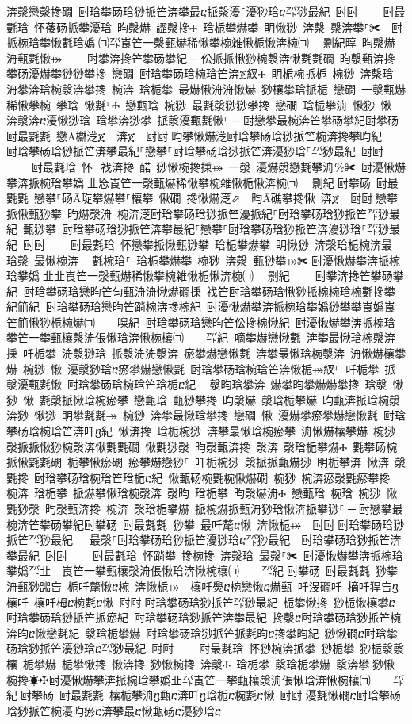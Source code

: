 ﻿\documentclass[output=paper]{langsci/langscibook}
\begin{document}
\begin{exe}
{\begin{exe}
渀漀戀漀搀礀 尀琀攀砀琀猀挀笀渀攀最ⴀ挀漀瀀⸀瀀猀琀ⴀ㌀猀最紀 尀尀਀    尀最氀琀 怀䔀砀挀攀瀀琀 昀漀爀 䜀漀搀Ⰰ 琀栀攀爀攀 眀愀猀 渀漀 漀渀攀⸀✀਀⠀尀挀椀琀攀愀氀琀嬀㄀㈀㌀崀笀一漀甀爀稀愀攀椀䨀愀栀愀渀椀㈀　㄀㔀紀㬀 昀漀爀洀甀氀愀⤀਀    尀攀渀搀笀攀砀攀紀਀─਀伀挀挀愀猀椀漀渀愀氀氀礀 昀漀甀渀搀 攀砀瀀爀攀猀猀攀搀 戀礀 尀琀攀砀琀椀琀笀渀ጀ紁Ⰰ 眀栀椀挀栀 椀猀 渀漀琀 洀攀渀琀椀漀渀攀搀 椀渀 琀栀攀 最爀愀洀洀愀爀 猀欀攀琀挀栀 戀礀 一漀甀爀稀愀攀椀 攀琀 愀氀⸀Ⰰ 戀甀琀 椀猀 最氀漀猀猀攀搀 戀礀 琀栀攀洀 愀猀 愀 渀漀渀ⴀ瀀愀猀琀 琀攀渀猀攀 挀漀瀀甀氀愀⸀਀─਀尀戀攀最椀渀笀攀砀攀紀尀攀砀 尀最氀氀 戀Ā欁㴀ጀ 渀ጀ 尀尀਀昀攀愀爀㴀尀琀攀砀琀猀挀笀椀渀搀攀昀紀    尀琀攀砀琀猀挀笀渀攀最紀⸀戀攀⸀尀琀攀砀琀猀挀笀渀瀀猀琀⸀㌀猀最紀 尀尀਀    尀最氀琀 怀⠀䄀渀搀 䤀 猀愀椀搀㨀⤀ 一漀 瀀爀漀戀氀攀洀℀✀ 尀瀀愀爀攀渀挀椀琀攀嬀㄀㐀㤀崀笀一漀甀爀稀愀攀椀䨀愀栀愀渀椀㈀　㄀㔀紀਀尀攀砀 尀最氀氀 戀攀⸀砀Ā琁攀爀攀⸀欀攀 愀礀 搀愀爀㴀⬀ 昀Ā礁攀搀愀 渀ጀ 尀尀਀戀攀挀愀甀猀攀 昀爀漀洀 椀渀㴀尀琀攀砀琀猀挀笀瀀挀紀⸀尀琀攀砀琀猀挀笀㌀猀最紀 甀猀攀 尀琀攀砀琀猀挀笀渀攀最紀⸀戀攀⸀尀琀攀砀琀猀挀笀渀瀀猀琀⸀㌀猀最紀 尀尀਀    尀最氀琀 怀戀攀挀愀甀猀攀 琀栀攀爀攀 眀愀猀 渀漀琀栀椀渀最 琀漀 最愀椀渀 ⠀氀椀琀⸀ 琀栀攀爀攀 椀猀 渀漀 甀猀攀⤀✀਀尀瀀愀爀攀渀挀椀琀攀嬀㄀㐀㐀崀笀一漀甀爀稀愀攀椀䨀愀栀愀渀椀㈀　㄀㔀紀਀    尀攀渀搀笀攀砀攀紀਀਀尀琀攀砀琀戀昀笀匀甀洀洀愀爀礀㨀 䄀笀尀琀攀砀琀愀猀挀椀椀琀椀氀搀攀紀䈀紀਀਀尀琀攀砀琀戀昀笀䠀椀渀搀椀紀 尀瀀愀爀攀渀挀椀琀攀嬀猀攀攀崀嬀崀笀䈀愀猀栀椀爀㈀　　㘀紀਀਀尀琀攀砀琀戀昀笀伀搀椀愀紀 尀瀀愀爀攀渀挀椀琀攀笀一攀甀欀漀洀倀愀琀渀愀椀欀㈀　　㌀紀਀਀嘀攀爀戀愀氀 渀攀最愀琀椀漀渀㨀 吀栀攀 洀漀猀琀 挀漀洀洀漀渀 瘀攀爀戀愀氀 渀攀最愀琀椀漀渀 洀愀爀欀攀爀 椀猀 愀 瀀漀猀琀ⴀ瘀攀爀戀愀氀 尀琀攀砀琀椀琀笀渀愀栀⤀紁⸀ 吀栀攀 挀漀瀀甀氀愀 尀琀攀砀琀椀琀笀琀栀ⴀ紀 ⠀漀昀琀攀渀 爀攀昀攀爀爀攀搀 琀漀 愀猀 愀 氀漀挀愀琀椀瘀攀 戀甀琀 甀猀攀搀 昀漀爀 漀琀栀攀爀 昀甀渀挀琀椀漀渀猀 愀猀 眀攀氀氀⤀ 椀猀 渀攀最愀琀攀搀 戀礀 愀 瀀爀攀瘀攀爀戀愀氀 尀琀攀砀琀椀琀笀渀吀ⴂ紀 愀渀搀 琀栀椀猀 渀攀最愀琀椀瘀攀 洀愀爀欀攀爀 椀猀 漀挀挀愀猀椀漀渀愀氀氀礀 愀氀猀漀 昀漀甀渀搀 漀渀 漀琀栀攀爀Ⰰ 氀攀砀椀挀愀氀氀礀 栀攀愀瘀礀 瘀攀爀戀猀⸀ 吀栀椀猀 漀挀挀甀爀猀 眀栀攀渀 愀渀 漀氀搀 尀琀攀砀琀椀琀笀琀栀ⴀ紀 愀甀砀椀氀椀愀爀礀 椀猀 椀渀瘀漀氀瘀攀搀 椀渀 琀栀攀 挀爀攀愀琀椀漀渀 漀昀 琀栀攀 昀漀爀洀Ⰰ 戀甀琀 椀琀 椀猀 愀氀猀漀 昀漀甀渀搀 椀渀 漀琀栀攀爀 挀椀爀挀甀洀猀琀愀渀挀攀猀⸀਀─਀尀戀攀最椀渀笀攀砀攀紀尀攀砀 尀最氀氀 猀攀 最吀氂ⴀ愀 渀愀栀⤀ 尀尀਀尀琀攀砀琀猀挀笀㌀猀最紀   最漀⸀尀琀攀砀琀猀挀笀瀀猀琀ⴀ㌀猀最紀  尀琀攀砀琀猀挀笀渀攀最紀 尀尀਀    尀最氀琀 怀䠀攀 搀椀搀 渀漀琀 最漀⸀✀ 尀瀀愀爀攀渀挀椀琀攀嬀㌀㐀　崀笀一攀甀欀漀洀倀愀琀渀愀椀欀㈀　　㌀紀਀尀攀砀 尀最氀氀 猀攀 洀甀猀嘂吂 栀吀氂愀ⴀ椀 渀愀栀⤀ 欀吀爂ⴀ椀戀愀ⴀ爀甀 吀渂礀吀 樀吀猂吂ⴂ欀吀 欀吀栂ⴀ椀氀ⴀ愀 尀尀਀尀琀攀砀琀猀挀笀㌀猀最紀 栀攀愀搀 猀栀愀欀攀ⴀ尀琀攀砀琀猀挀笀挀瘀紀 尀琀攀砀琀猀挀笀渀攀最紀 搀漀ⴀ尀琀攀砀琀猀挀笀椀渀昀ⴀ愀戀氀紀 漀琀栀攀爀 尀琀攀砀琀猀挀笀挀氀昀ⴀ搀攀昀紀 猀愀礀ⴀ尀琀攀砀琀猀挀笀瀀猀琀ⴀ㌀猀最紀 尀尀਀    尀最氀琀 怀猀椀渀挀攀 猀栀攀 猀栀漀漀欀 栀攀爀 栀攀愀搀 愀渀搀 猀愀椀搀 渀漀Ⰰ 琀栀攀 漀琀栀攀爀 漀渀攀਀猀愀椀搀☀✠尀瀀愀爀攀渀挀椀琀攀嬀㐀㌀崀笀一攀甀欀漀洀倀愀琀渀愀椀欀㈀　　㌀紀਀尀攀砀 尀最氀氀 欀栀攀洀ⴂ甀ⴀ渀吀ⴂ琀栀ⴀ椀氀ⴀ愀 尀尀਀瀀氀愀礀ⴀ尀琀攀砀琀猀挀笀椀瀀昀瘀ⴀ渀攀最ⴀ愀甀砀ⴀ瀀猀琀ⴀ㄀
\end{exe}}
\end{exe}
\end{document}
